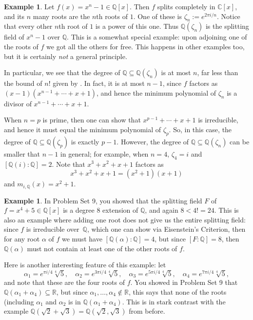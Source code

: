 \documentclass[12pt]{report}
\numberwithin{equation}{section}
\numberwithin{theorem}{chapter}
\theoremstyle{definition}
\newtheorem{example}[theorem]{Example}
\newtheorem*{basic properties}{Basic Properties}
\newtheorem*{Important Remark}{Important Remark}
\newcommand{\C}{\mathbb{C}}
\begin{document}
\begin{example} 
Let $f(x) = x^n -1 \in \mathbb{Q}[x]$. Then $f$ splits completely in
  $\C[x]$, and its $n$ many roots are the $n$th roots of $1$. One of these
  is $\zeta_n := e^{2 \pi i/n}$. Notice that every other $n$th root of $1$ is a power of this one. 
Thus $\mathbb{Q}(\zeta_n)$ is the splitting field of $x^n-1$ over $\mathbb{Q}$. 
This is a somewhat special example: upon adjoining one of the roots of $f$ we got all the others for free. This happens in other examples too, but it is certainly {\em not} a general principle.


In particular, we see that the degree of $\mathbb{Q} \subseteq \mathbb{Q}(\zeta_n)$ is at most $n$, far less than the bound of $n!$ given by .
In fact, it is at most $n-1$, since $f$ factors as $(x-1)(x^{n-1} + \cdots + x + 1)$, and hence the minimum polynomial of $\zeta_n$ is a divisor of $x^{n-1} + \cdots + x + 1$. 

When $n = p$ is prime, then one can show that $x^{p-1} + \cdots + x + 1$ is irreducible, and hence it must equal the minimum polynomial of $\zeta_p$. So, in this case, the degree of $\mathbb{Q} \subseteq \mathbb{Q}(\zeta_p)$ is exactly $p-1$.
However, the degree of $\mathbb{Q} \subseteq \mathbb{Q}(\zeta_n)$ can be smaller that $n-1$ in general; for example, when $n = 4$, $\zeta_4  = i$ and $[\mathbb{Q}(i): \mathbb{Q}] = 2$. Note that $x^3 + x^2 + x + 1$ factors as 
$$x^3 + x^2 + x + 1 = (x^2+1)(x+1)$$
and $m_{i, \mathbb{Q}}(x) = x^2 + 1$.
\end{example}




\begin{example}\label{example a+b not same as a b}
	In Problem Set 9, you showed that the splitting field $F$ of $f = x^4 + 5 \in \mathbb{Q}[x]$ is a degree $8$ extension of $\mathbb{Q}$, and again $8<4!=24$. This is also an example where adding one root does not give us the entire splitting field: since $f$ is irreducible over~$\mathbb{Q}$, which one can show via Eisenstein's Criterion, then for any root $\alpha$ of $f$ we must have $[\mathbb{Q}(\alpha) : \mathbb{Q}] = 4$, but since $[F:\mathbb{Q}] = 8$, then $\mathbb{Q}(\alpha)$ must not contain at least one of the other roots of $f$. 
	
Here is another interesting feature of this example: let
$$\alpha_1 = e^{\pi i/4}\sqrt[4]{5}, \quad
\alpha_2 = e^{3\pi i/4}\sqrt[4]{5}, \quad
\alpha_3 = e^{5\pi i/4}\sqrt[4]{5}, \quad
\alpha_4 = e^{7\pi i/4}\sqrt[4]{5},$$
and note that these are the four roots of $f$. You showed in Problem Set 9 that $\mathbb{Q}(\alpha_1 + \alpha_4) \subseteq \mathbb{R}$, but since $\alpha_1, \ldots, \alpha_4 \notin \mathbb{R}$, this says that none of the roots (including $\alpha_1$ and $\alpha_2$ is in $\mathbb{Q}(\alpha_1 + \alpha_4)$. This is in stark contrast with the example $\mathbb{Q}(\sqrt{2}+\sqrt{3}) = \mathbb{Q}(\sqrt{2}, \sqrt{3})$ from before.
\end{example}
\end{document}
